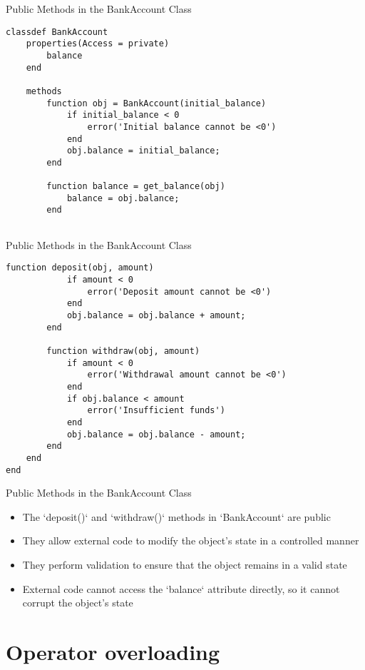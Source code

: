 \documentclass[handout]{beamer}
\begin{document}
\begin{frame}[fragile]{Public Methods in the BankAccount Class}
  \begin{lstlisting}[style=matlab]
classdef BankAccount
    properties(Access = private)
        balance
    end
    
    methods
        function obj = BankAccount(initial_balance)
            if initial_balance < 0
                error('Initial balance cannot be <0')
            end
            obj.balance = initial_balance;
        end
        
        function balance = get_balance(obj)
            balance = obj.balance;
        end
    
  \end{lstlisting}
\end{frame}    
\begin{frame}[fragile]{Public Methods in the BankAccount Class}
  \begin{lstlisting}[style=matlab]
        function deposit(obj, amount)
            if amount < 0
                error('Deposit amount cannot be <0')
            end
            obj.balance = obj.balance + amount;
        end
        
        function withdraw(obj, amount)
            if amount < 0
                error('Withdrawal amount cannot be <0')
            end
            if obj.balance < amount
                error('Insufficient funds')
            end
            obj.balance = obj.balance - amount;
        end
    end
end

  \end{lstlisting}
\end{frame}

\begin{frame}[fragile]{Public Methods in the BankAccount Class}
  \begin{itemize}
    \item The `deposit()` and `withdraw()` methods in `BankAccount` are public
    \item They allow external code to modify the object's state in a controlled manner
    \item They perform validation to ensure that the object remains in a valid state
    \item External code cannot access the `balance` attribute directly, so it cannot corrupt the object's state
  \end{itemize}
\end{frame}

\section{Operator overloading}
\end{document}
